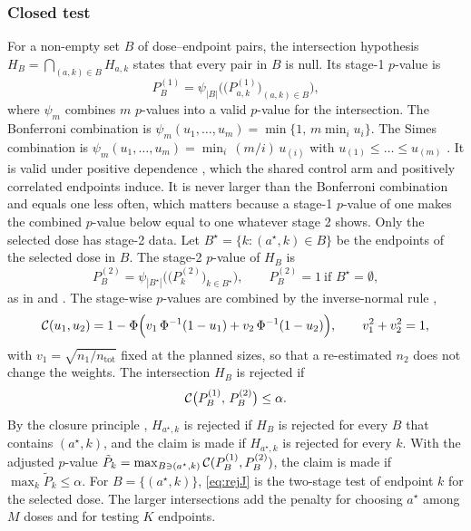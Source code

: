 \subsubsection{Closed test}
For a non-empty set $B$ of dose--endpoint pairs, the intersection hypothesis $H_B=\bigcap_{(a,k)\in B}H_{a,k}$ states that every pair in $B$ is null. Its stage-1 $p$-value is
\begin{equation}\label{eq:p1J}
P^{(1)}_{B}=\psi_{|B|}\Big(\big(P^{(1)}_{a,k}\big)_{(a,k)\in B}\Big),
\end{equation}
where $\psi_m$ combines $m$ $p$-values into a valid $p$-value for the intersection. The Bonferroni combination is $\psi_m(u_1,\dots,u_m)=\min\{1,\,m\min_i u_i\}$. The Simes combination is $\psi_m(u_1,\dots,u_m)=\min_i\,(m/i)\,u_{(i)}$ with $u_{(1)}\le\dots\le u_{(m)}$ \citep{simes1986}. It is valid under positive dependence \citep{sarkar1998,benjamini2001}, which the shared control arm and positively correlated endpoints induce. It is never larger than the Bonferroni combination and equals one less often, which matters because a stage-1 $p$-value of one makes the combined $p$-value below equal to one whatever stage 2 shows. Only the selected dose has stage-2 data. Let $B^\star=\{k:(a^\star,k)\in B\}$ be the endpoints of the selected dose in $B$. The stage-2 $p$-value of $H_B$ is
\begin{equation}\label{eq:p2J}
P^{(2)}_{B}=\psi_{|B^\star|}\Big(\big(P^{(2)}_{k}\big)_{k\in B^\star}\Big),\qquad P^{(2)}_B=1\ \text{if }B^\star=\emptyset,
\end{equation}
as in \citet{posch2005} and \citet{bretz2006}. The stage-wise $p$-values are combined by the inverse-normal rule \citep{lehmacher1999},
\begin{equation}\label{eq:comb}
\mathcal{C}(u_1,u_2)=1-\Phi\Big(v_1\,\Phi^{-1}(1-u_1)+v_2\,\Phi^{-1}(1-u_2)\Big),\qquad v_1^2+v_2^2=1,
\end{equation}
with $v_1=\sqrt{n_1/n_{\mathrm{tot}}}$ fixed at the planned sizes, so that a re-estimated $n_2$ does not change the weights. The intersection $H_B$ is rejected if
\begin{equation}\label{eq:rejJ}
\mathcal{C}\big(P^{(1)}_{B},\,P^{(2)}_{B}\big)\le\alpha .
\end{equation}
By the closure principle \citep{marcus1976}, $H_{a^\star,k}$ is rejected if $H_B$ is rejected for every $B$ that contains $(a^\star,k)$, and the claim is made if $H_{a^\star,k}$ is rejected for every $k$. With the adjusted $p$-value $\tilde P_k=\max_{B\ni(a^\star,k)}\mathcal{C}(P^{(1)}_{B},P^{(2)}_{B})$, the claim is made if $\max_k\tilde P_k\le\alpha$. For $B=\{(a^\star,k)\}$, \eqref{eq:rejJ} is the two-stage test of endpoint $k$ for the selected dose. The larger intersections add the penalty for choosing $a^\star$ among $M$ doses and for testing $K$ endpoints.


